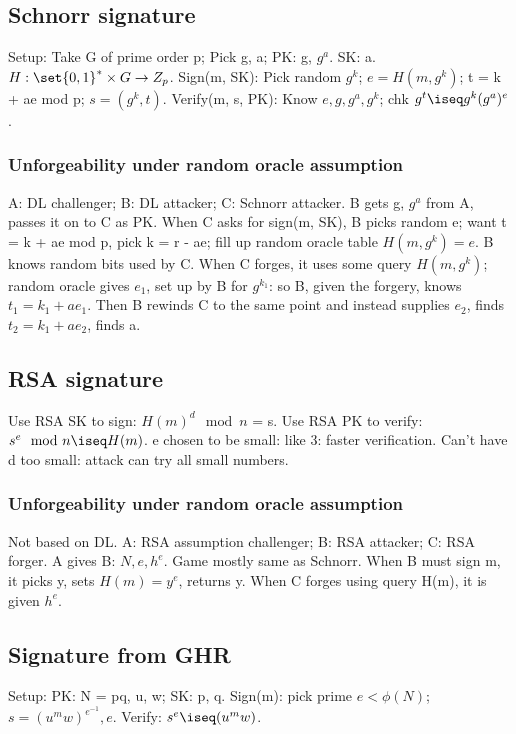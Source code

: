 \documentclass[oneside, article]{memoir}
\begin{document}
\subsection{Schnorr signature}
Setup: Take G of prime order p; Pick g, a; PK: g, $g^{a}$. SK: a. $H:\set{0, 1}^{*} \times G \to Z_{p}$. Sign(m, SK): Pick random $g^{k}$; $e = H(m, g^{k})$; t = k + ae mod p; $s=(g^{k}, t)$. Verify(m, s, PK): Know $e, g, g^{a}, g^{k}$; chk $g^{t} \iseq g^{k}(g^{a})^{e}$.

\subsubsection{Unforgeability under random oracle assumption}
A: DL challenger; B: DL attacker; C: Schnorr attacker. B gets g, $g^{a}$ from A, passes it on to C as PK. When C asks for sign(m, SK), B picks random e; want t = k + ae mod p, pick k = r - ae; fill up random oracle table $H(m, g^{k}) = e$. B knows random bits used by C. When C forges, it uses some query $H(m, g^{k})$; random oracle gives $e_{1}$, set up by B for $g^{k_{1}}$: so B, given the forgery, knows $t_{1} = k_{1} + ae_{1}$. Then B rewinds C to the same point and instead supplies $e_{2}$, finds $t_{2} = k_{1} + ae_{2}$, finds a.

\subsection{RSA signature}
Use RSA SK to sign: $H(m)^{d} \mod n$ = s. Use RSA PK to verify: $s^{e} \mod n \iseq H(m)$. e chosen to be small: like 3: faster verification. Can't have d too small: attack can try all small numbers.

\subsubsection{Unforgeability under random oracle assumption}
Not based on DL. A: RSA assumption challenger; B: RSA attacker; C: RSA forger. A gives B: $N, e, h^{e}$. Game mostly same as Schnorr. When B must sign m, it picks y, sets $H(m) = y^{e}$, returns y. When C forges using query H(m), it is given $h^{e}$.

\subsection{Signature from GHR}
Setup: PK: N = pq, u, w; SK: p, q. Sign(m): pick prime $e < \phi(N)$; $s = (u^{m}w)^{e^{-1}}, e$. Verify: $s^{e} \iseq (u^{m}w)$.
\end{document}
